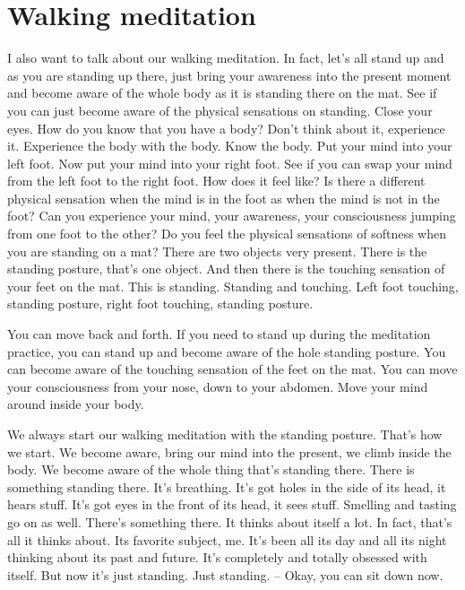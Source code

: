 \documentclass[letterpaper,10pt,english]{sphinxmanual}
\begin{document}
\section{Walking meditation}
\label{\detokenize{0-b:walking-meditation}}
\sphinxAtStartPar
I also want to talk about our walking meditation. In fact, let’s all stand
up and as you are standing up there, just bring your awareness into the present moment and become aware of the whole body as it is standing there on
the  mat.  See  if  you  can  just  become  aware  of  the  physical  sensations  on
standing. Close your eyes. How do you know that you have a body? Don’t
think about it, experience it. Experience the body with the body. Know the
body. Put your mind into your left foot. Now put your mind into your right
foot. See if you can swap your mind from the left foot to the right foot. How
does it feel like? Is there a different physical sensation when the mind is in
the foot as when the mind is not in the foot? Can you experience your mind,
your awareness, your consciousness jumping from one foot to the other? Do
  you feel the physical sensations of softness when you are standing on a mat?
There are two objects very present. There is the standing posture, that’s one
object. And then there is the touching sensation of your feet on the mat. This
is  standing.  Standing  and  touching.  Left  foot  touching,  standing  posture,
right foot touching, standing posture.

\sphinxAtStartPar
You can move back and forth. If you need to stand up during the meditation  practice,  you  can  stand  up  and  become  aware  of  the  hole  standing
posture. You can become aware of the touching sensation of the feet on the
mat. You can move your consciousness from your nose, down to your abdomen. Move your mind around inside your body.

\sphinxAtStartPar
We  always  start  our  walking  meditation  with  the  standing  posture.
That’s how we start. We become aware, bring our mind into the present, we
climb inside the body. We become aware of the whole thing that’s standing
there. There is something standing there. It’s breathing. It’s got holes in the
side of its head, it hears stuff. It’s got eyes in the front of its head, it sees
stuff. Smelling and tasting go on as well. There’s something there. It thinks
about itself a lot. In fact, that’s all it thinks about. Its favorite subject, me.
It’s been all its day and all its night thinking about its past and future. It’s
completely and totally obsessed with itself. But now it’s just standing. Just
standing. – Okay, you can sit down now.
\end{document}
